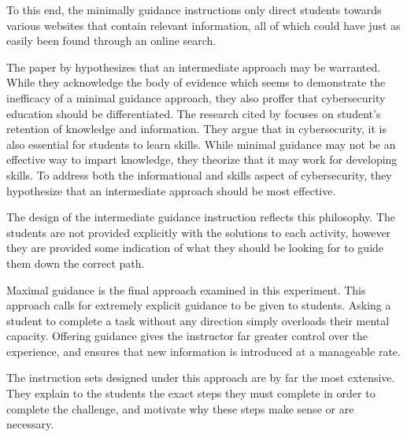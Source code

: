         To this end, the minimally guidance instructions only direct students towards various websites that contain relevant information, all of which could have just as easily been found through an online search. 

        The paper by \textcite{R-Weiss} hypothesizes that an intermediate approach may be warranted. %
While they acknowledge the body of evidence which seems to demonstrate the inefficacy of a minimal guidance approach, they also proffer that cybersecurity education should be differentiated. %
The research cited by \citeauthor{J-Sweller} focuses on student's retention of knowledge and information. %
They argue that in cybersecurity, it is also essential for students to learn skills. %
While minimal guidance may not be an effective way to impart knowledge, they theorize that it may work for developing skills. %
To address both the informational and skills aspect of cybersecurity, they hypothesize that an intermediate approach should be most effective. 

        The design of the intermediate guidance instruction reflects this philosophy. %
The students are not provided explicitly with the solutions to each activity, however they are provided some indication of what they should be looking for to guide them down the correct path.

        Maximal guidance is the final approach examined in this experiment. %
This approach calls for extremely explicit guidance to be given to students. %
Asking a student to complete a task without any direction simply overloads their mental capacity. %
Offering guidance gives the instructor far greater control over the experience, and ensures that new information is introduced at a manageable rate. 

        The instruction sets designed under this approach are by far the most extensive. %
They explain to the students the exact steps they must complete in order to complete the challenge, and motivate why these steps make sense or are necessary. 



